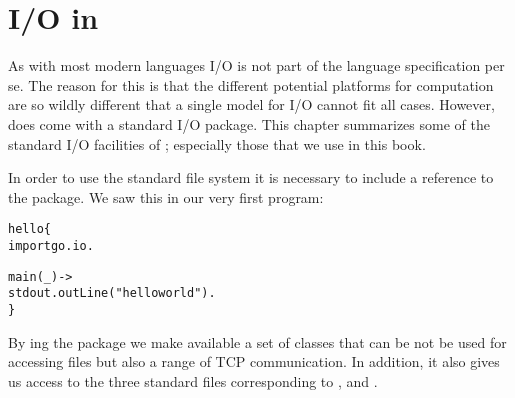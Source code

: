 \chapter{I/O in \go}
\label{io}

As with most modern languages I/O is not part of the language specification per se. The reason for this is that the different potential platforms for computation are so wildly different that a single model for I/O cannot fit all cases. However, \go does come with a standard I/O package. This chapter summarizes some of the standard I/O facilities of \go; especially those that we use in this book.

In order to use the standard file system it is necessary to include a reference to the  package. We saw this in our very first program:
\begin{alltt}
hello\{
  import go.io.
  
  main(_) ->
    stdout.outLine("hello world").
\}
\end{alltt}
By ing the  package we make available a set of classes that can be not be used for accessing files but also a range of TCP communication. In addition, it also gives us access to the three standard files corresponding to ,  and .




